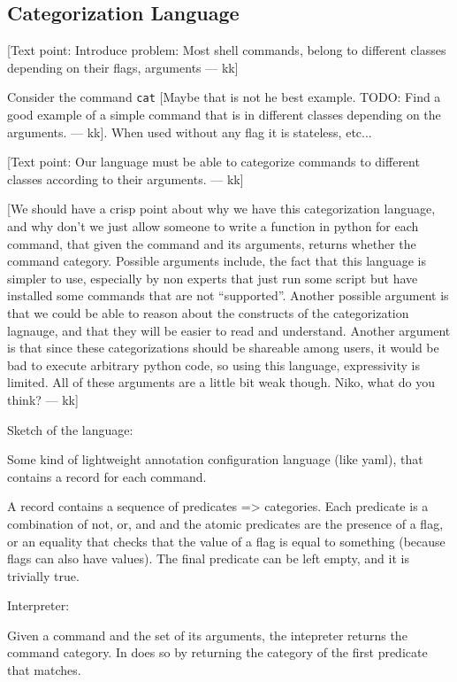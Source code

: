 \documentclass[sigplan,10pt,review,anonymous]{acmart}
\newcommand{\kk}[1]{[{\color{magenta}#1 --- kk}]}
\begin{document}
\subsection{Categorization Language}

\kk{Text point: Introduce problem: Most shell commands, belong to
  different classes depending on their flags, arguments}

Consider the command \texttt{cat} \kk{Maybe that is not he best
  example. TODO: Find a good example of a simple command that is in
  different classes depending on the arguments.}. When used without
any flag it is stateless, etc...

\kk{Text point: Our language must be able to categorize commands to
  different classes according to their arguments.}

\kk{We should have a crisp point about why we have this categorization
  language, and why don't we just allow someone to write a function in
  python for each command, that given the command and its arguments,
  returns whether the command category. Possible arguments include,
  the fact that this language is simpler to use, especially by non
  experts that just run some script but have installed some commands
  that are not ``supported''. Another possible argument is that we
  could be able to reason about the constructs of the categorization
  lagnauge, and that they will be easier to read and
  understand. Another argument is that since these categorizations
  should be shareable among users, it would be bad to execute
  arbitrary python code, so using this language, expressivity is
  limited. All of these arguments are a little bit weak though. Niko,
  what do you think?}

Sketch of the language:

Some kind of lightweight annotation configuration language (like
yaml), that contains a record for each command.

A record contains a sequence of predicates => categories. Each
predicate is a combination of not, or, and and the atomic predicates
are the presence of a flag, or an equality that checks that the value
of a flag is equal to something (because flags can also have
values). The final predicate can be left empty, and it is trivially true.

Interpreter:

Given a command and the set of its arguments, the intepreter returns
the command category. In does so by returning the category of the first
predicate that matches.
\end{document}
